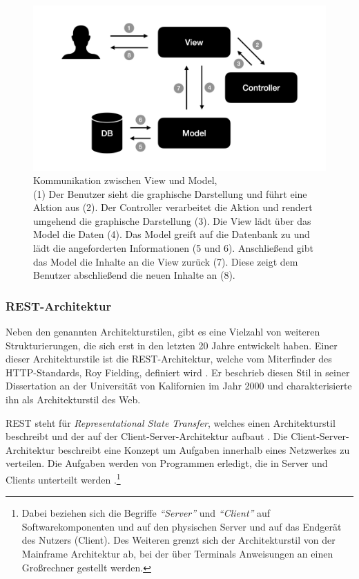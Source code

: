  \begin{figure}
 	\centering
    \includegraphics[width=.6\textwidth]{Assets/Interaktionsorientiert.002}
	\caption[Kommunikation zwischen View und Model]{Kommunikation zwischen View und Model, \\ (1) Der Benutzer sieht die graphische Darstellung und führt eine Aktion aus (2). Der Controller verarbeitet die Aktion und rendert umgehend die graphische Darstellung (3). Die View lädt über das Model die Daten (4). Das Model greift auf die Datenbank zu und lädt die angeforderten Informationen (5 und 6). Anschließend gibt das Model die Inhalte an die View zurück (7). Diese zeigt dem Benutzer abschließend die neuen Inhalte an (8).}
    \label{fig:mvc-vm-kommunikation}
 \end{figure}

\subsubsection{REST-Architektur}
\label{sec:rest}

Neben den genannten Architekturstilen, gibt es eine Vielzahl von weiteren Strukturierungen, die sich erst in den letzten 20 Jahre entwickelt haben. Einer dieser Architekturstile ist die REST-Architektur, welche vom Miterfinder des HTTP-Standards, Roy Fielding, definiert wird \parencite[][S. 128]{starke_effektive_2015}. Er beschrieb diesen Stil in seiner Dissertation an der Universität von Kalifornien im Jahr 2000 und charakterisierte ihn als Architekturstil des Web.

REST steht für \textit{Representational State Transfer}, welches einen Architekturstil beschreibt und der auf der Client-Server-Architektur aufbaut \parencite[][S. 76]{fielding_architectural_2000}.
Die Client-Server-Architektur beschreibt eine Konzept um Aufgaben innerhalb eines Netzwerkes zu verteilen. Die Aufgaben werden von Programmen erledigt, die in Server und Clients unterteilt werden \parencite[][S. 117]{starke_effektive_2015}.\footnote{Dabei beziehen sich die Begriffe \textit{\enquote{Server}} und \textit{\enquote{Client}} auf Softwarekomponenten und auf den physischen Server und auf das Endgerät des Nutzers (Client). Des Weiteren grenzt sich der Architekturstil von der Mainframe Architektur ab, bei der über Terminals Anweisungen an einen Großrechner gestellt werden.}

